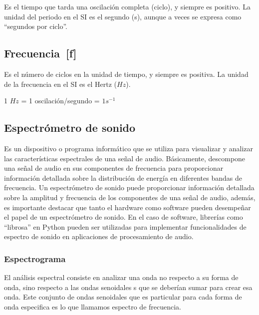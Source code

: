 \documentclass[letterpaper, 12pt]{article}
\begin{document}
Es el tiempo que tarda una oscilación completa (ciclo), y
siempre es positivo. La unidad del periodo en el SI es el
segundo (s), aunque a veces se expresa como “segundos por
ciclo”.

\subsection*{Frecuencia~[f]}

Es el número de ciclos en la unidad de tiempo, y siempre es
positiva. La unidad de la frecuencia en el SI es el Hertz
($Hz$).

1 $Hz$ = 1 oscilación/segundo = $1s^{-1}$

\subsection*{Espectrómetro de sonido~\cite{espectometro}}

Es un dispositivo o programa informático que se utiliza
para visualizar y analizar las características espectrales
de una señal de audio. Básicamente, descompone una señal de
audio en sus componentes de frecuencia para proporcionar
información detallada sobre la distribución de energía en
diferentes bandas de frecuencia. Un espectrómetro de sonido
puede proporcionar información detallada sobre la amplitud
y frecuencia de los componentes de una señal de audio,
además, es importante destacar que tanto el hardware como
software pueden desempeñar el papel de un espectrómetro de
sonido. En el caso de software, librerías como ``librosa''
en Python pueden ser utilizadas para implementar
funcionalidades de espectro de sonido en aplicaciones de
procesamiento de audio.

\subsubsection*{Espectrograma~\cite{espectograma}}

El análisis espectral consiste en analizar una onda no
respecto a su forma de onda, sino respecto a las ondas
senoidales s que se deberían sumar para crear esa onda.
Este conjunto de ondas senoidales que es particular para
cada forma de onda especifica es lo que llamamos espectro
de frecuencia.
\end{document}
